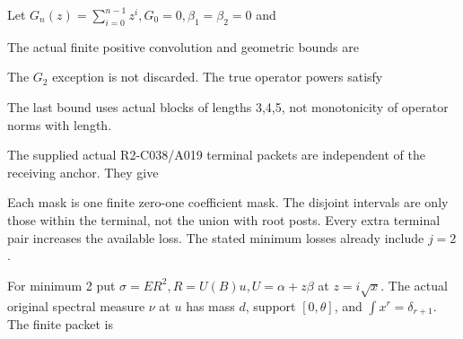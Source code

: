 Let \(G_n(z)=\sum_{i=0}^{n-1} z^i,\allowbreak \allowbreak  G_0=0,\allowbreak \allowbreak  \beta_{1}=\beta_{2}=0\) and


The actual finite positive convolution and geometric bounds are



The \(G_{2}\) exception is not discarded. The true operator powers satisfy


The last bound uses actual blocks of lengths 3,4,5, not monotonicity of operator norms with length.

The supplied actual R2-C038/A019 terminal packets are independent of the receiving anchor. They give


Each mask is one finite zero-one coefficient mask. The disjoint intervals are only those within the terminal, not the union with root posts. Every extra terminal pair increases the available loss. The stated minimum losses already include \(j=2\).

For minimum 2 put \(\sigma=ER^2,\allowbreak \allowbreak  R=U(B)u,\allowbreak \allowbreak  U=\alpha+z \beta\) at \(z=i \sqrt{x}\). The actual original spectral measure \(\nu\) at \(u\) has mass \(d\), support \([0,\allowbreak \allowbreak \theta]\), and \(\int  x^r=\delta_{r+1}\). The finite packet is

